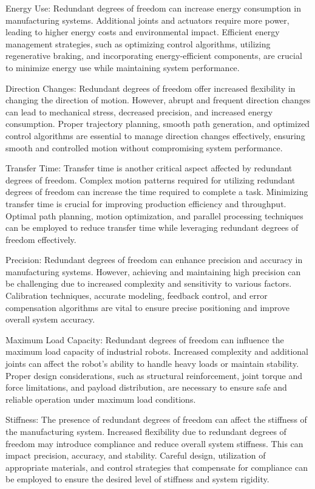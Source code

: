 Energy Use:
Redundant degrees of freedom can increase energy consumption in manufacturing systems. Additional joints and actuators require more power, leading to higher energy costs and environmental impact. Efficient energy management strategies, such as optimizing control algorithms, utilizing regenerative braking, and incorporating energy-efficient components, are crucial to minimize energy use while maintaining system performance.

Direction Changes:
Redundant degrees of freedom offer increased flexibility in changing the direction of motion. However, abrupt and frequent direction changes can lead to mechanical stress, decreased precision, and increased energy consumption. Proper trajectory planning, smooth path generation, and optimized control algorithms are essential to manage direction changes effectively, ensuring smooth and controlled motion without compromising system performance.

Transfer Time:
Transfer time is another critical aspect affected by redundant degrees of freedom. Complex motion patterns required for utilizing redundant degrees of freedom can increase the time required to complete a task. Minimizing transfer time is crucial for improving production efficiency and throughput. Optimal path planning, motion optimization, and parallel processing techniques can be employed to reduce transfer time while leveraging redundant degrees of freedom effectively.

Precision:
Redundant degrees of freedom can enhance precision and accuracy in manufacturing systems. However, achieving and maintaining high precision can be challenging due to increased complexity and sensitivity to various factors. Calibration techniques, accurate modeling, feedback control, and error compensation algorithms are vital to ensure precise positioning and improve overall system accuracy.

Maximum Load Capacity:
Redundant degrees of freedom can influence the maximum load capacity of industrial robots. Increased complexity and additional joints can affect the robot's ability to handle heavy loads or maintain stability. Proper design considerations, such as structural reinforcement, joint torque and force limitations, and payload distribution, are necessary to ensure safe and reliable operation under maximum load conditions.

Stiffness:
The presence of redundant degrees of freedom can affect the stiffness of the manufacturing system. Increased flexibility due to redundant degrees of freedom may introduce compliance and reduce overall system stiffness. This can impact precision, accuracy, and stability. Careful design, utilization of appropriate materials, and control strategies that compensate for compliance can be employed to ensure the desired level of stiffness and system rigidity.
